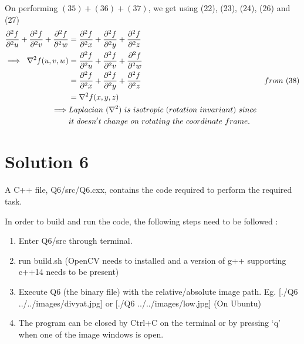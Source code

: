 \documentclass[a4paper,fleqn,11pt]{article}
\theoremstyle{mytheor}
\begin{document}
On performing $(35) + (36) + (37)$, we get using (22), (23), (24), (26) and (27)
\begin{align}
\frac{\partial^2 f}{\partial^2 u} +
\frac{\partial^2 f}{\partial^2 v} +
\frac{\partial^2 f}{\partial^2 w} & =
\frac{\partial^2 f}{\partial^2 x} +
\frac{\partial^2 f}{\partial^2 y} +
\frac{\partial^2 f}{\partial^2 z}\\
\implies\ \nabla^2 f(u, v, w) & = \frac{\partial^2 f}{\partial^2 u} +
							  \frac{\partial^2 f}{\partial^2 v} +
						      \frac{\partial^2 f}{\partial^2 w} \\
						      & = \frac{\partial^2 f}{\partial^2 x} +
							  \frac{\partial^2 f}{\partial^2 y} +
						      \frac{\partial^2 f}{\partial^2 z} & from\ (38) \\
						      & =  \nabla^2 f(x, y, z) \\
\implies & Laplacian\ (\nabla^2)\ is\ isotropic\ (rotation\ invariant)\ since\notag \\ 
& it\ doesn't\ change\ on\ rotating\ the\ coordinate\ frame. \notag
\end{align}

\section*{Solution 6}
A C++ file, Q6/src/Q6.cxx, contains the code required to perform the required task.

In order to build and run the code, the following steps need to be followed :
\begin{enumerate}
\item Enter Q6/src through terminal.
\item run build.sh (OpenCV needs to installed and a version of g++ supporting c++14 needs to be present)
\item Execute Q6 (the binary file) with the relative/absolute image path. Eg. [./Q6 ../../images/divyat.jpg] or [./Q6 ../../images/low.jpg] (On Ubuntu)
\item The program can be closed by Ctrl+C on the terminal or by pressing `q' when one of the image windows is open.
\end{enumerate}
\pagebreak
\end{document}
